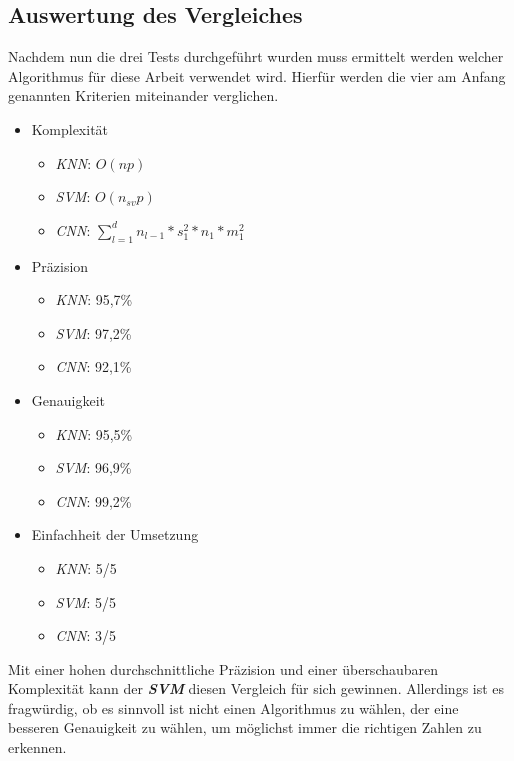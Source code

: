 \subsection{Auswertung des Vergleiches} \label{ssec:eval}
Nachdem nun die drei Tests durchgeführt wurden muss ermittelt werden welcher Algorithmus für diese Arbeit verwendet wird. Hierfür werden die vier am Anfang genannten Kriterien miteinander verglichen.
\begin{itemize}
    \item Komplexität
          \begin{itemize}
              \item \textit{KNN}: $O(np)$
              \item \textit{SVM}: $O(n_{sv}p)$
              \item \textit{CNN}: $\sum^{d}_{l=1}n_{l-1} * s^2_1 * n_1 * m^2_1$
          \end{itemize}
    \item Präzision
          \begin{itemize}
              \item \textit{KNN}: 95,7\%
              \item \textit{SVM}: 97,2\%
              \item \textit{CNN}: 92,1\%
          \end{itemize}
    \item Genauigkeit
          \begin{itemize}
              \item \textit{KNN}: 95,5\%
              \item \textit{SVM}: 96,9\%
              \item \textit{CNN}: 99,2\%
          \end{itemize}
    \item Einfachheit der Umsetzung
          \begin{itemize}
              \item \textit{KNN}: 5/5
              \item \textit{SVM}: 5/5
              \item \textit{CNN}: 3/5
          \end{itemize}
\end{itemize}
Mit einer hohen durchschnittliche Präzision und einer überschaubaren Komplexität kann der \textit{\textbf{SVM}} diesen Vergleich für sich gewinnen. Allerdings ist es fragwürdig, ob es sinnvoll ist nicht einen Algorithmus zu wählen, der eine besseren Genauigkeit zu wählen, um möglichst immer die richtigen Zahlen zu erkennen.\par

